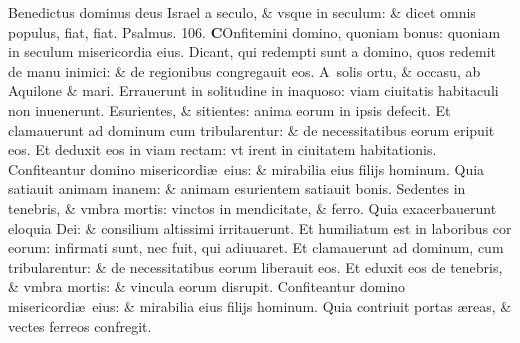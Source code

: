 \documentclass[a5paper,10pt]{book}
\def\ae{æ}
\begin{document}
\begin{multicols*}{2}
\newline \color{red} B\color{black}enedictus dominus deus Israel a seculo, \& vsque in seculum: \& dicet omnis populus, fiat, fiat.
\newline \color{red} Psalmus. \hypertarget{ps106}{106.} \color{black}
\vspace{-.5em}
\lettrine[lines=2]{\bfseries \color{red} C}{}Onfitemini domino, quoniam bonus: quoniam in seculum misericordia eius.
\newline \color{red} D\color{black}icant, qui redempti sunt a domino, quos redemit de manu inimici: \& de regionibus congregauit eos.
\newline \color{red} A\color{black}\ solis ortu, \& occasu, ab Aquilone \& mari.
\newline \color{red} E\color{black}rrauerunt in solitudine in inaquoso: viam ciuitatis habitaculi non inuenerunt.
\newline \color{red} E\color{black}surientes, \& sitientes: anima eorum in ipsis defecit.
\newline \color{red} E\color{black}t clamauerunt ad dominum cum tribularentur: \& de necessitatibus eorum eripuit eos.
\newline \color{red} E\color{black}t deduxit eos in viam rectam: vt irent in ciuitatem habitationis.
\newline \color{red} C\color{black}onfiteantur domino misericordi\ae \ eius: \& mirabilia eius filijs hominum.
\newline \color{red} Q\color{black}uia satiauit animam inanem: \& animam esurientem satiauit bonis.
\newline \color{red} S\color{black}edentes in tenebris, \& vmbra mortis: vinctos in mendicitate, \& ferro.
\newline \color{red} Q\color{black}uia exacerbauerunt eloquia Dei: \& consilium altissimi irritauerunt.
\newline \color{red} E\color{black}t humiliatum est in laboribus cor eorum: infirmati sunt, nec fuit, qui adiuuaret.
\newline \color{red} E\color{black}t clamauerunt ad dominum, cum tribularentur: \& de necessitatibus eorum liberauit eos.
\newline \color{red} E\color{black}t eduxit eos de tenebris, \& vmbra mortis: \& vincula eorum disrupit.
\newline \color{red} C\color{black}onfiteantur domino misericordi\ae \ eius: \& mirabilia eius filijs hominum.
\newline \color{red} Q\color{black}uia contriuit portas \ae reas, \& vectes ferreos confregit.

\end{multicols*}
\end{document}
